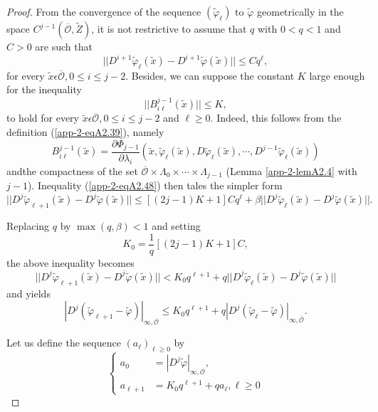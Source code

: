 \begin{proof}
From the convergence of the sequence $(\widetilde{\varphi}_{\ell})$ to
$\widetilde{\varphi}$ geometrically in the space
$C^{j-1}(\overline{\mathscr{O}}, \widetilde{Z})$, it is not
restrictive to assume that $q$ with $0 < q < 1$ and $C > 0$ are such
that
$$
||D^{i+1}\widetilde{\varphi}_{\ell}(\widetilde{x}) -
D^{i+1}\widetilde{\varphi}(\widetilde{x})|| \leq Cq^{\ell},
$$
for every $\widetilde{x} \epsilon \overline{\mathscr{O}}, 0 \leq i
\leq j-2$. Besides, we can suppose the constant $K$ large enough for the
inequality
$$
||B_{i\ell}^{j-1}(\widetilde{x})|| \leq K,
$$
to hold for every $\widetilde{x} \epsilon \overline{\mathscr{O}}, 0
\leq i \leq j-2$ and $\ell \geq 0$. Indeed, this follows from the
definition (\ref{app-2-eqA2.39}), namely
$$
B_{i\ell}^{j-1}(\widetilde{x}) = \frac{\partial \Phi_{j-1}}{\partial
  \lambda_{i}} (\widetilde{x},
\widetilde{\varphi}_{\ell}(\widetilde{x}),
D\widetilde{\varphi}_{\ell}(\widetilde{x}), \cdots,
D^{j-1}\widetilde{\varphi}_{\ell}(\widetilde{x})) 
$$
and\pageoriginale the compactness of the set $\overline{\mathscr{O}}
\times \Lambda_{0} \times \cdots \times \Lambda_{j-1}$ (Lemma \ref{app-2-lemA2.4}
with $j-1$). Inequality (\ref{app-2-eqA2.48}) then tales the simpler form 
$$
||D^{j}\widetilde{\varphi}_{\ell + 1}(\widetilde{x}) -
D^{j}\widetilde{\varphi}(\widetilde{x})|| \leq [(2j-1)K+1]Cq^{\ell} +
\beta ||D^{j}\widetilde{\varphi}_{\ell}(\widetilde{x}) -
D^{j}\widetilde{\varphi}(\widetilde{x})||. 
$$

Replacing $q$ by $\max(q, \beta) < 1$ and setting
$$
K_{0} = \frac{1}{q}[(2j-1)K + 1]C,
$$
the above inequality becomes
$$
||D^{j}\widetilde{\varphi}_{\ell + 1}(\widetilde{x}) -
D^{j}\widetilde{\varphi}(\widetilde{x})|| < K_{0}q^{\ell + 1} + q
||D^{j}\widetilde{\varphi}_{\ell}(\widetilde{x}) -
D^{j}\widetilde{\varphi}(\widetilde{x})|| 
$$
and yields
\begin{equation*}
|D^{j}(\widetilde{\varphi}_{\ell + 1} - \widetilde{\varphi})|_{\infty,
\overline{\mathscr{O}}} \leq K_{0}q^{\ell + 1} +
q|D^{j}(\widetilde{\varphi}_{\ell}-\widetilde{\varphi})|_{\infty,
  \overline{\mathscr{O}}}.\tag{A2.49}\label{app-2-eqA2.49} 
\end{equation*}

Let us define the sequence $(a_{\ell})_{\ell \geq 0}$ by
\begin{equation*}
\begin{cases}
a_{0} & = |D^{j}\widetilde{\varphi}|_{\infty,
  \overline{\mathscr{O}}},\\
a_{\ell + 1} & = K_{0}q^{\ell+1} + qa_{\ell}, \ell \geq 0
\end{cases}
\end{equation*}


\end{proof}
